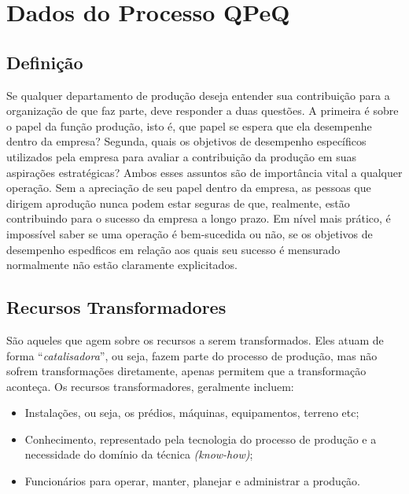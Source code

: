 \chapter[Dados do Processo QPeQ]{Dados do Processo QPeQ}
\label{chap:dados}
	
	\section[Definição]{Definição}
	\label{sec:dados_definicao}

	Se qualquer departamento de produção deseja entender sua contribuição para a organização de que faz parte, deve responder a duas questões. A primeira é sobre o papel da função produção, isto é, que papel se espera que ela desempenhe dentro da empresa? Segunda, quais os objetivos de desempenho específicos utilizados pela empresa para avaliar a contribuição da produção em suas aspirações estratégicas? Ambos esses assuntos são de importância vital a qualquer operação. Sem a apreciação de seu papel dentro da empresa, as pessoas que dirigem aprodução nunca podem estar seguras de que, realmente, estão contribuindo para o sucesso da empresa a longo prazo. Em nível mais prático, é impossível saber se uma operação é bem-sucedida ou não, se os objetivos de desempenho espedficos em relação aos quais seu sucesso é mensurado normalmente não estão claramente explicitados. \cite{slack}

	\section[Recursos Transformadores]{Recursos Transformadores}
	\label{sec:dados_transformadores}

		São aqueles que agem sobre os recursos a serem transformados. Eles atuam de forma “\emph{catalisadora}”, ou seja, fazem parte do processo de produção, mas não sofrem transformações diretamente, apenas permitem que a transformação aconteça. Os recursos transformadores, geralmente incluem: 

		\begin{itemize}
			\item{Instalações, ou seja, os prédios, máquinas, equipamentos, terreno etc;}
			\item{Conhecimento, representado pela tecnologia do processo de produção e a necessidade do domínio da técnica \emph{(know-how)};}
			\item{Funcionários para operar, manter, planejar e administrar a produção.}
		\end{itemize}


